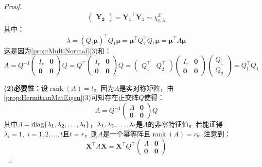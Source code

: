 \begin{proof}
\begin{align*}
\begin{pmatrix}
			\mathbf{Y_2}
		\end{pmatrix}
		=\mathbf{Y_1}^{\top}\mathbf{Y_1}\sim\chi_{r,\lambda}^2
	\end{align*}
	其中：
	\begin{equation*}
		\lambda=(Q_1\boldsymbol{\mu})^{\top}Q_1\boldsymbol{\mu}=\boldsymbol{\mu}^{\top}Q_1^{\top}Q_1\boldsymbol{\mu}=\boldsymbol{\mu}^{\top}A\boldsymbol{\mu}
	\end{equation*}
	这是因为\cref{prop:MultiNormal}(3)和：
	\begin{equation*}
		A=Q^{-1}
		\begin{pmatrix}
			I_r & \mathbf{0} \\
			\mathbf{0} & \mathbf{0}
		\end{pmatrix}Q
		=Q^{\top}
		\begin{pmatrix}
			I_r & \mathbf{0} \\
			\mathbf{0} & \mathbf{0}
		\end{pmatrix}Q
		=
		\begin{pmatrix}
			Q_1^{\top} & Q_2^{\top}
		\end{pmatrix}
			\begin{pmatrix}
			I_r & \mathbf{0} \\
			\mathbf{0} & \mathbf{0}
		\end{pmatrix}
		\begin{pmatrix}
			Q_1 \\
			Q_2
		\end{pmatrix}
		=Q_1^{\top}Q_1
	\end{equation*}\par
	\textbf{(2)必要性：}设$\operatorname{rank}(A)=t$。因为$A$是实对称矩阵，由\cref{prop:HermitianMatEigen}(3)可知存在正交阵$Q$使得：
	\begin{equation*}
		A=Q^{-1}
		\begin{pmatrix}
			\varLambda & \mathbf{0} \\
			\mathbf{0} & \mathbf{0}
		\end{pmatrix}
		Q
	\end{equation*}
	其中$\varLambda=\operatorname{diag}\{\lambda_1, \lambda_2, \dots, \lambda_{t}\}$，$\lambda_1, \lambda_2, \dots, \lambda_{t}$是$A$的非零特征值。若能证得$\lambda_i=1,\;i=1,2,\dots,t$且$t=r$，则$A$是一个幂等阵且$\operatorname{rank}(A)=r$。注意到：
	\begin{equation*}
		\mathbf{X}^{\top}A\mathbf{X}=\mathbf{X}^{\top}Q^{\top}
		\begin{pmatrix}
			\varLambda & \mathbf{0} \\
			\mathbf{0} & \mathbf{0}
		\end{pmatrix}

\end{equation*}
\end{proof}
